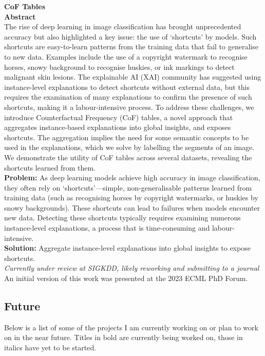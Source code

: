 \noindent
\textbf{CoF Tables}\\
\textbf{Abstract} \\
The rise of deep learning in image classification has brought unprecedented accuracy but also highlighted a key 
issue: the use of `shortcuts' by models. Such shortcuts are easy-to-learn patterns from the training data that 
fail to generalise to new data. Examples include the use of a copyright watermark to recognise horses, snowy 
background to recognise huskies, or ink markings to detect malignant skin lesions. The explainable AI (XAI) 
community has suggested using instance-level explanations to detect shortcuts without external data, 
but this requires the examination of many explanations to confirm the presence of such shortcuts, making it a 
labour-intensive process. To address these challenges, we introduce Counterfactual Frequency (CoF) tables, 
a novel approach that aggregates instance-based explanations into global insights, and exposes shortcuts. 
The aggregation implies the need for some semantic concepts to be used in the explanations, which we solve by 
labelling the segments of an image. We demonstrate the utility of CoF tables across several datasets, revealing 
the shortcuts learned from them.\\
\textbf{Problem:} As deep learning models achieve high accuracy in image classification, they often rely on 
`shortcuts'—simple, non-generalisable patterns learned from training data (such as recognising horses by copyright 
watermarks, or huskies by snowy backgrounds). These shortcuts can lead to failures when models encounter new data. 
Detecting these shortcuts typically requires examining numerous instance-level explanations, a process that is 
time-consuming and labour-intensive. \\
\textbf{Solution:} Aggregate instance-level explanations into global insights to expose shortcuts.\\
\textit{Currently under review at SIGKDD, likely reworking and submitting to a journal} \\
An initial version of this work was presented at the 2023 ECML PhD Forum.

\subsection*{Future}
Below is a list of some of the projects I am currently working on or plan to work on in the near future.
Titles in bold are currently being worked on, those in italics have yet to be started.

